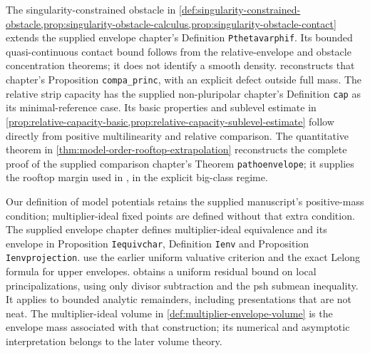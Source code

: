 The singularity-constrained obstacle in \cref{def:singularity-constrained-obstacle,prop:singularity-obstacle-calculus,prop:singularity-obstacle-contact} extends the supplied envelope chapter's Definition \texttt{Pthetavarphif}. Its bounded quasi-continuous contact bound follows from the relative-envelope and obstacle concentration theorems; it does not identify a smooth density.  reconstructs that chapter's Proposition \texttt{compa\_princ}, with an explicit defect outside full mass. The relative strip capacity has the supplied non-pluripolar chapter's Definition \texttt{cap} as its minimal-reference case. Its basic properties and sublevel estimate in \cref{prop:relative-capacity-basic,prop:relative-capacity-sublevel-estimate} follow directly from positive multilinearity and relative comparison. The quantitative theorem in \cref{thm:model-order-rooftop-extrapolation} reconstructs the complete proof of the supplied comparison chapter's Theorem \texttt{pathoenvelope}; it supplies the rooftop margin used in \cite[Theorem \texttt{rooftop}]{VuXiaNakamaye}, in the explicit big-class regime.

Our definition of model potentials retains the supplied manuscript's positive-mass condition; multiplier-ideal fixed points are defined without that extra condition. The supplied envelope chapter defines multiplier-ideal equivalence and its envelope in Proposition \texttt{Iequivchar}, Definition \texttt{Ienv} and Proposition \texttt{Ienvprojection}.  use the earlier uniform valuative criterion and the exact Lelong formula for upper envelopes.  obtains a uniform residual bound on local principalizations, using only divisor subtraction and the psh submean inequality. It applies to bounded analytic remainders, including presentations that are not neat. The multiplier-ideal volume in \cref{def:multiplier-envelope-volume} is the envelope mass associated with that construction; its numerical and asymptotic interpretation belongs to the later volume theory.

